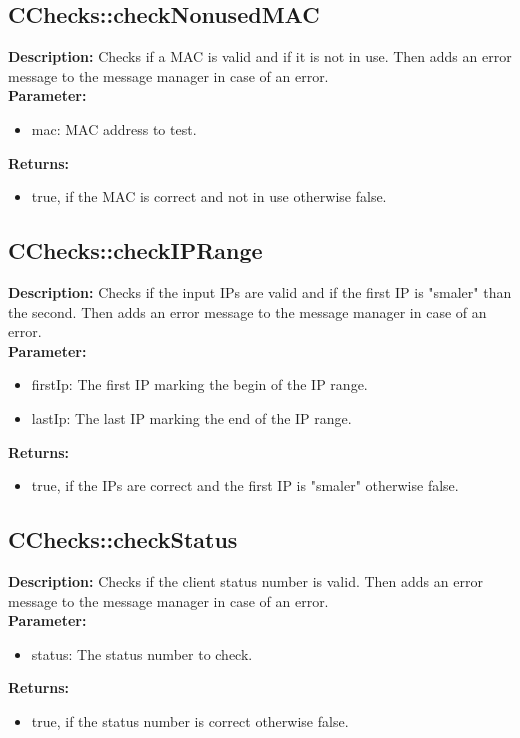 \subsection{CChecks::checkNonusedMAC}
\textbf{Description:} Checks if a MAC is valid and if it is not in use. Then adds an error message to the message manager in case of an error.\\
\textbf{Parameter:}
\begin{itemize}
\item mac: MAC address to test.
\end{itemize}
\textbf{Returns:}
\begin{itemize}
\item true, if the MAC is correct and not in use otherwise false.
\end{itemize}

\subsection{CChecks::checkIPRange}
\textbf{Description:} Checks if the input IPs are valid and if the first IP is "smaler" than the second. Then adds an error message to the message manager in case of an error.\\
\textbf{Parameter:}
\begin{itemize}
\item firstIp: The first IP marking the begin of the IP range.
\item lastIp: The last IP marking the end of the IP range.
\end{itemize}
\textbf{Returns:}
\begin{itemize}
\item true, if the IPs are correct and the first IP is "smaler" otherwise false.
\end{itemize}

\subsection{CChecks::checkStatus}
\textbf{Description:} Checks if the client status number is valid. Then adds an error message to the message manager in case of an error.\\
\textbf{Parameter:}
\begin{itemize}
\item status: The status number to check.
\end{itemize}
\textbf{Returns:}
\begin{itemize}
\item true, if the status number is correct otherwise false.
\end{itemize}

